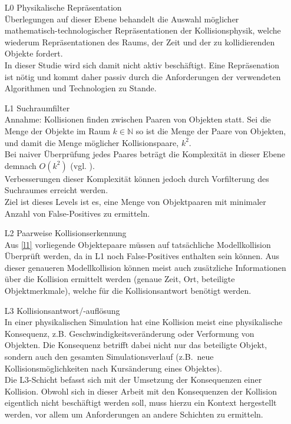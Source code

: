 \begin{itemize}
	\label{l0}
	\item[L0] Physikalische Repräsentation\\
		Überlegungen auf dieser Ebene behandelt die Auswahl möglicher mathematisch-technologischer Repräsentationen der Kollisionsphysik, welche wiederum Repräsentationen des Raums, der Zeit und der zu kollidierenden Objekte fordert.\\
		In dieser Studie wird sich damit nicht aktiv beschäftigt. Eine Repräsenation ist nötig und kommt daher passiv durch die Anforderungen der verwendeten Algorithmen und Technologien zu Stande.\\
			
	\label{l1}
	\item[L1] Suchraumfilter\\
		Annahme: Kollisionen finden zwischen Paaren von Objekten statt.
		Sei die Menge der Objekte im Raum $k\in\mathbb{N}$ so ist die Menge der Paare von Objekten, und damit die Menge möglicher Kollisionspaare, $k^2$.\\
		Bei naiver Überprüfung jedes Paares beträgt die Komplexität in dieser Ebene demnach $O(k^2)$ (vgl. \cite[Abschn. 2]{cd2D}).\\
		Verbesserungen dieser Komplexität können jedoch durch Vorfilterung des Suchraumes erreicht werden.\\
		Ziel ist dieses Levels ist es, eine Menge von Objektpaaren mit minimaler Anzahl von False-Positives zu ermitteln.

	\label{l2}
	\item[L2] Paarweise Kollisionserkennung\\
		Aus \ref{l1} vorliegende Objektepaare müssen auf tatsächliche Modellkollision Überprüft werden, da in L1 noch False-Positives enthalten sein können.
		Aus dieser genaueren Modellkollision können meist auch zusätzliche Informationen über die Kollision ermittelt werden (genaue Zeit, Ort, beteiligte Objektmerkmale), welche für die Kollisionsantwort benötigt werden.

	\label{l3}
	\item[L3] Kollisionsantwort/-auflösung\\
		In einer physikalischen Simulation hat eine Kollision meist eine physikalische Konsequenz, z.B. Geschwindigkeitsveränderung oder Verformung von Objekten. Die Konsequenz betrifft dabei nicht nur das beteiligte Objekt, sondern auch den gesamten Simulationsverlauf (z.B.~neue Kollisionsmöglichkeiten nach Kursänderung eines Objektes).\\
		Die L3-Schicht befasst sich mit der Umsetzung der Konsequenzen einer Kollision.
		Obwohl sich in dieser Arbeit mit den Konsequenzen der Kollision eigentlich nicht beschäftigt werden soll, muss hierzu ein Kontext hergestellt werden, vor allem um Anforderungen an andere Schichten zu ermitteln.
\end{itemize}

